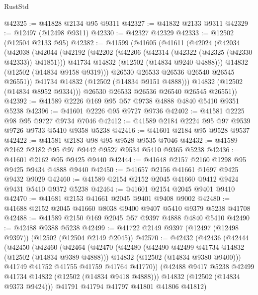 \begin{lexlean}{RustStd}
\begin{coremodule}
@42325 := @41828 @2134 @95 @9311
@42327 := @41832 @2133 @9311
@42329 := @12497 (@12498 @9311)
@42330 := @42327 @42329
@42333 := @12502 (@12504 @2133 @95)
@42382 := @41599
    (@41605
      (@41611
        (@42024
          (@42034
            (@42038
              (@42044
                (@42192
                  (@42202
                    (@42206 (@42314 (@42322 (@42325 (@42330 @42333)) @41851)))
                    @41734
                    @14832
                    (@12502 (@14834 @9240 @4888)))
                  @14832
                  (@12502 (@14834 @9158 @9319)))
                @26530
                @26533
                @26536
                @26540
                @26545
                @26551))
            @41734
            @14832
            (@12502 (@14834 @9151 @4888)))
          @14832
          (@12502 (@14834 @8952 @9334)))
        @26530
        @26533
        @26536
        @26540
        @26545
        @26551))
@42392 := @41589 @2226 @169 @95 @57 @9738 @4888 @4840 @5410 @9351 @5238
@42396 := @41601 @2226 @95 @9727 @9736
@42402 := @41581 @2225 @98 @95 @9727 @9734 @7046
@42412 := @41589 @2184 @2224 @95 @97 @9539 @9726 @9733 @5410 @9358 @5238
@42416 := @41601 @2184 @95 @9528 @9537
@42422 := @41581 @2183 @98 @95 @9528 @9535 @7046
@42432 := @41589 @2162 @2182 @95 @97 @9442 @9527 @9534 @5410 @9365 @5238
@42436 := @41601 @2162 @95 @9425 @9440
@42444 := @41648 @2157 @2160 @1298 @95 @9425 @9434 @4888 @9440
@42450 := @41657 @2156 @41661 @1697 @9425 @9432 @9029
@42460 := @41589 @2154 @2152 @2045 @41660 @9412 @9424 @9431 @5410 @9372 @5238
@42464 := @41601 @2154 @2045 @9401 @9410
@42470 := @41681 @2153 @41661 @2045 @9401 @9408 @9002
@42480 := @41688 @2152 @2045 @41660 @8038 @9400 @9407 @5410 @9379 @5238 @41708
@42488 := @41589 @2150 @169 @2045 @57 @9397 @4888 @4840 @5410
@42490 := @42488 @9388 @5238
@42499 := @41722 @2149 @9397 (@12497 (@12498 @9397)) (@12502 (@12504 @2149 @2045))
@42570 := @42432
    (@42436
      (@42444
        (@42450
          (@42460
            (@42464
              (@42470
                (@42480
                  (@42490 @42499 @41734 @14832 (@12502 (@14834 @9389 @4888)))
                  @14832
                  (@12502 (@14834 @9380 @9400)))
                @41749
                @41752
                @41755
                @41759
                @41764
                @41770))
            (@42488 @9417 @5238 @42499 @41734 @14832 (@12502 (@14834 @9418 @4888)))
            @14832
            (@12502 (@14834 @9373 @9424)))
          @41791
          @41794
          @41797
          @41801
          @41806
          @41812)

\end{coremodule}
\end{lexlean}
